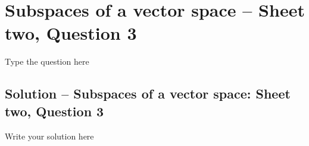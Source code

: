 \section{Subspaces of a vector space -- Sheet two, Question 3}
Type  the question here


\subsection{Solution -- Subspaces of a vector space: Sheet two, Question 3}

Write your solution here